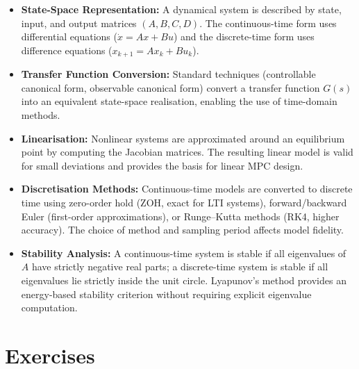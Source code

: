 \begin{itemize}
	\item \textbf{State-Space Representation:} A dynamical system is described by state, input, and output matrices $(A, B, C, D)$. The continuous-time form uses differential equations ($\dot{x} = Ax + Bu$) and the discrete-time form uses difference equations ($x_{k+1} = Ax_k + Bu_k$).

	\item \textbf{Transfer Function Conversion:} Standard techniques (controllable canonical form, observable canonical form) convert a transfer function $G(s)$ into an equivalent state-space realisation, enabling the use of time-domain methods.

	\item \textbf{Linearisation:} Nonlinear systems are approximated around an equilibrium point by computing the Jacobian matrices. The resulting linear model is valid for small deviations and provides the basis for linear MPC design.

	\item \textbf{Discretisation Methods:} Continuous-time models are converted to discrete time using zero-order hold (ZOH, exact for LTI systems), forward/backward Euler (first-order approximations), or Runge--Kutta methods (RK4, higher accuracy). The choice of method and sampling period affects model fidelity.

	\item \textbf{Stability Analysis:} A continuous-time system is stable if all eigenvalues of $A$ have strictly negative real parts; a discrete-time system is stable if all eigenvalues lie strictly inside the unit circle. Lyapunov's method provides an energy-based stability criterion without requiring explicit eigenvalue computation.
\end{itemize}

\section*{Exercises}


